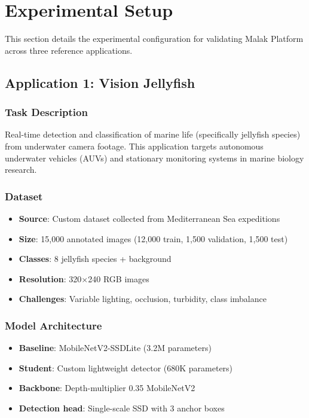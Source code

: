 \section{Experimental Setup}

This section details the experimental configuration for validating Malak Platform across three reference applications.

\subsection{Application 1: Vision Jellyfish}

\subsubsection{Task Description}
Real-time detection and classification of marine life (specifically jellyfish species) from underwater camera footage. This application targets autonomous underwater vehicles (AUVs) and stationary monitoring systems in marine biology research.

\subsubsection{Dataset}
\begin{itemize}
\item \textbf{Source}: Custom dataset collected from Mediterranean Sea expeditions
\item \textbf{Size}: 15,000 annotated images (12,000 train, 1,500 validation, 1,500 test)
\item \textbf{Classes}: 8 jellyfish species + background
\item \textbf{Resolution}: 320$\times$240 RGB images
\item \textbf{Challenges}: Variable lighting, occlusion, turbidity, class imbalance
\end{itemize}

\subsubsection{Model Architecture}
\begin{itemize}
\item \textbf{Baseline}: MobileNetV2-SSDLite (3.2M parameters)
\item \textbf{Student}: Custom lightweight detector (680K parameters)
\item \textbf{Backbone}: Depth-multiplier 0.35 MobileNetV2
\item \textbf{Detection head}: Single-scale SSD with 3 anchor boxes
\end{itemize}

